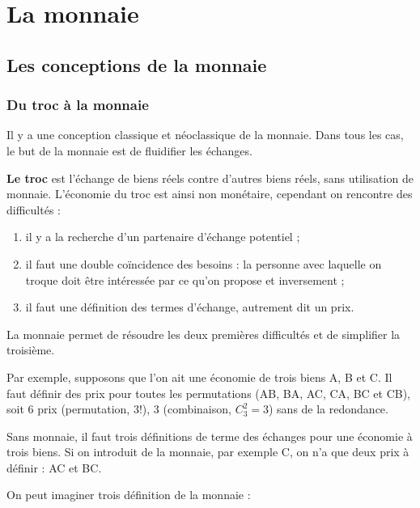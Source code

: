 \chapter{La monnaie}

\section{Les conceptions de la monnaie}

	\subsection{Du troc à la monnaie}
	
	Il y a une conception classique et néoclassique de la monnaie. Dans tous les cas, le but de la monnaie est de fluidifier les échanges.
	
	\textbf{Le troc} est l'échange de biens réels contre d'autres biens réels, sans utilisation de monnaie. L'économie du troc est ainsi non monétaire, cependant on rencontre des difficultés :
	
	\begin{enumerate}
		\item il y a la recherche d'un partenaire d'échange potentiel ;
		\item il faut une double coïncidence des besoins : la personne avec laquelle on troque doit être intéressée par ce qu'on propose et inversement ;
		\item il faut une définition des termes d'échange, autrement dit un prix.
	\end{enumerate}
	
	La monnaie permet de résoudre les deux premières difficultés et de simplifier la troisième.
	
	Par exemple, supposons que l'on ait une économie de trois biens A, B et C. Il faut définir des prix pour toutes les permutations (AB, BA, AC, CA, BC et CB), soit 6 prix (permutation, $3!$), 3 (combinaison, $C_3^2 = 3$) sans de la redondance.
	
	Sans monnaie, il faut trois définitions de terme des échanges pour une économie à trois biens. Si on introduit de la monnaie, par exemple C, on n'a que deux prix à définir : AC et BC.
	
	On peut imaginer trois définition de la monnaie :
	
